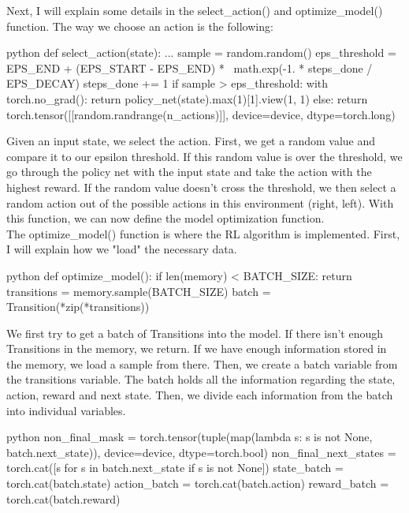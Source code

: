 \documentclass{article}
\numberwithin{equation}{section}
\numberwithin{equation}{section}
\begin{document}
Next, I will explain some details in the select\_action() and optimize\_model() function. The way we choose an action is the following:

\begin{mintedbox}{python}
def select_action(state):
...
    sample = random.random()
    eps_threshold = EPS_END + (EPS_START - EPS_END) * \
        math.exp(-1. * steps_done / EPS_DECAY)
    steps_done += 1
    if sample > eps_threshold:
        with torch.no_grad():
            return policy_net(state).max(1)[1].view(1, 1)
    else:
        return torch.tensor([[random.randrange(n_actions)]], device=device, dtype=torch.long)
\end{mintedbox}
Given an input state, we select the action. First, we get a random value and compare it to our epsilon threshold. If this random value is over the threshold, we go through the policy net with the input state and take the action with the highest reward. If the random value doesn't cross the threshold, we then select a random action out of the possible actions in this environment (right, left). With this function, we can now define the model optimization function. \\

The optimize\_model() function is where the RL algorithm is implemented. First, I will explain how we "load" the necessary data.

\begin{mintedbox}{python}
def optimize_model():
    if len(memory) < BATCH_SIZE:
        return
    transitions = memory.sample(BATCH_SIZE)
    batch = Transition(*zip(*transitions))
\end{mintedbox}

We first try to get a batch of Transitions into the model. If there isn't enough Transitions in the memory, we return. If we have enough information stored in the memory, we load a sample from there. Then, we create a batch variable from the transitions variable. The batch holds all the information regarding the state, action, reward and next state. Then, we divide each information from the batch into individual variables.

\begin{mintedbox}{python}
non_final_mask = torch.tensor(tuple(map(lambda s: s is not None,
                                          batch.next_state)), device=device, dtype=torch.bool)
    non_final_next_states = torch.cat([s for s in batch.next_state
                                                if s is not None])
    state_batch = torch.cat(batch.state)
    action_batch = torch.cat(batch.action)
    reward_batch = torch.cat(batch.reward)
\end{mintedbox} 
\end{document}
